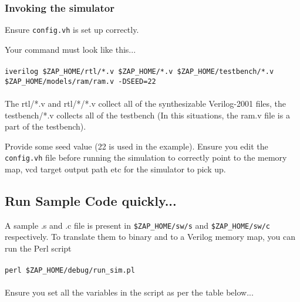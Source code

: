 \documentclass[11pt]{article}
\begin{document}

\subsubsection{Invoking the simulator}
Ensure \texttt{config.vh} is set up correctly.

Your command must look like this...\\\\
\texttt{iverilog \$ZAP\_HOME/rtl/*.v \$ZAP\_HOME/*.v \$ZAP\_HOME/testbench/*.v
\$ZAP\_HOME/models/ram/ram.v -DSEED=22}\\\\

The rtl/*.v and rtl/*/*.v collect all of the synthesizable Verilog-2001 files,
the testbench/*.v collects all of the testbench (In this situations, the ram.v
file is a part of the testbench).

Provide some seed value (22 is used in the example). Ensure you edit the 
\texttt{config.vh} file before running the simulation to correctly point to the
memory map, vcd target output path etc for the simulator to pick up.


\subsection{Run Sample Code quickly...}
A sample .s and .c file is present in \texttt{\$ZAP\_HOME/sw/s} and 
\texttt{\$ZAP\_HOME/sw/c} respectively. To translate them to binary and to a 
Verilog memory map, you can run the Perl script \\\\ 
\texttt{perl \$ZAP\_HOME/debug/run\_sim.pl} \\\\ Ensure you set all the variables
in the script as per the table below...\\\\
\end{document}
